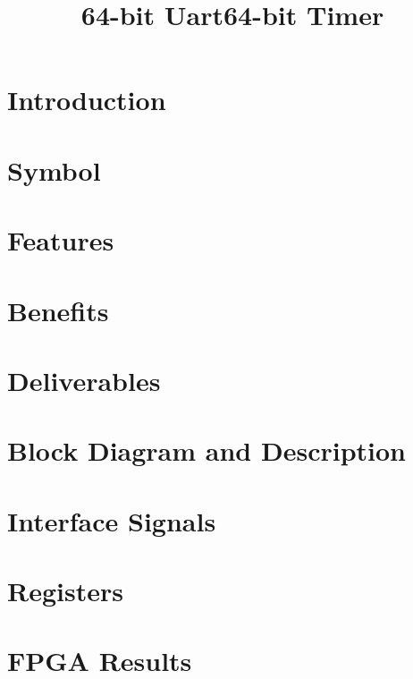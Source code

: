 \documentclass{../../submodules/TEX/document/ug/ug}
\title{64-bit Uart}
\title{64-bit Timer}
\begin{document}
\maketitle
\cleardoublepage
\tableofcontents
\listoftables
\listoffigures
\cleardoublepage

\section{Introduction}


\section{Symbol}


\section{\textcolor[rgb]{0,0,0}{Features}}

\clearpage

\section{\textcolor[rgb]{0,0,0}{Benefits}}


\section{\textcolor[rgb]{0,0,0}{Deliverables}}

\clearpage

\section{\textcolor[rgb]{0,0,0}{Block Diagram and Description}}

\clearpage

%

\section{Interface Signals}


\section{Registers}


\section{\textcolor[rgb]{0,0,0}{FPGA Results}}


%
%
\end{document}
